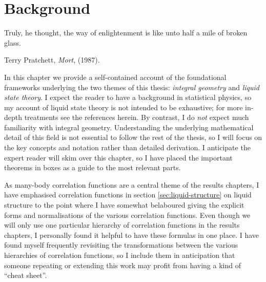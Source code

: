 \documentclass[11pt,twoside]{report}
\def\includebibliography{}
\begin{document}
\chapter{Background}
\epigraph{Truly, he thought, the way of enlightenment is like unto half a mile of broken glass.}{Terry Pratchett, \emph{Mort}, (1987).}
\label{chapter:background}

In this chapter we provide a self-contained account of the foundational frameworks underlying the two themes of this thesis: \emph{integral geometry} and \emph{liquid state theory}.
I expect the reader to have a background in statistical physics, so my account of liquid state theory is not intended to be exhaustive; for more in-depth treatments see the references herein.
By contrast, I do \emph{not} expect much familiarity with integral geometry.
Understanding the underlying mathematical detail of this field is not essential to follow the rest of the thesis, so I will focus on the key concepts and notation rather than detailed derivation.
I anticipate the expert reader will skim over this chapter, so I have placed the important theorems in boxes as a guide to the most relevant parts.

As many-body correlation functions are a central theme of the results chapters, I have emphasised correlation functions in section \ref{sec:liquid-structure} on liquid structure to the point where I have somewhat belaboured giving the explicit forms and normalisations of the various correlation functions.
Even though we will only use one particular hierarchy of correlation functions in the results chapters, I personally found it helpful to have these formulas in one place.
I have found myself frequently revisiting the transformations between the various hierarchies of correlation functions, so I include them in anticipation that someone repeating or extending this work may profit from having a kind of ``cheat sheet''.






\ifdefined\includebibliography
  \printbibliography
\fi
\end{document}
